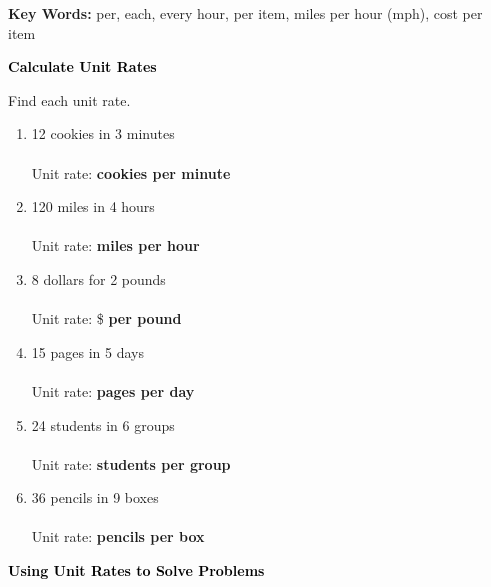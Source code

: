 \documentclass[12pt, letterpaper, fleqn]{article}
\newcommand{\blankshorter}{\underline{\hspace{1.5cm}}}
\begin{document}
\medskip

\vspace{1cm}

\noindent
\textbf{Key Words:} per, each, every hour, per item, miles per hour (mph), cost per item

\newpage

\begin{tcolorbox}[colback=customteal!20]
\large\textcolor{black}{\textbf{Calculate Unit Rates}}
\end{tcolorbox}

\noindent
Find each unit rate.

\begin{enumerate}[itemsep=1.5cm, leftmargin=0.6cm]
\item 12 cookies in 3 minutes\\ \\
Unit rate: \blankshorter \; \textbf{cookies per minute}

\item 120 miles in 4 hours\\ \\
Unit rate: \blankshorter \; \textbf{miles per hour}

\item 8 dollars for 2 pounds\\ \\
Unit rate: \$ \blankshorter \; \textbf{per pound}

\item 15 pages in 5 days\\ \\
Unit rate: \blankshorter \; \textbf{pages per day}

\item 24 students in 6 groups\\ \\
Unit rate: \blankshorter \; \textbf{students per group}

\item 36 pencils in 9 boxes\\ \\
Unit rate: \blankshorter \; \textbf{pencils per box}
\end{enumerate}

\newpage

\begin{tcolorbox}[colback=customteal!20]
\large\textcolor{black}{\textbf{Using Unit Rates to Solve Problems}}
\end{tcolorbox}
\end{document}
